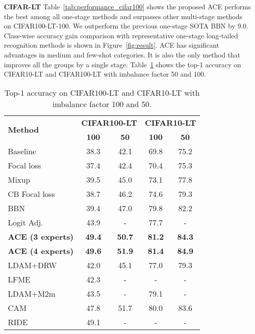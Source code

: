 \documentclass[10pt,twocolumn,letterpaper]{article}
\begin{document}
\textbf{CIFAR-LT} Table~\ref{tab:performance_cifar100} shows the proposed ACE performs the best among all one-stage methods and surpasses other multi-stage methods on CIFAR100-LT-100. We outperform the previous one-stage SOTA BBN by 9.0. Class-wise accuracy gain comparison with representative one-stage long-tailed recognition methods is shown in Figure~\ref{fig:result}. ACE has significant advantages in medium and few-shot categories. It is also the only method that improves all the groups by a single stage. Table~\ref{tab:performance_cifar} shows the top-1 accuracy on CIFAR10-LT and CIFAR100-LT with imbalance factor 50 and 100.\\

\begin{table}[t]
\small
\begin{center}
\begin{tabular}{p{2.7cm}|c c|c c}
\toprule[1.5pt]
 \multirow{2}{*}{\textbf{Method}} & \multicolumn{2}{c|}{\textbf{CIFAR100-LT}}  & \multicolumn{2}{c}{\textbf{CIFAR10-LT}}\\
 \cline{2-5}
 & \textbf{100} & \textbf{50} & \textbf{100} & \textbf{50} \\\hline
 Baseline & 38.3 & 42.1 & 69.8 & 75.2 \\
 Focal loss \cite{lin2017focal} & 37.4 & 42.4  & 70.4 & 75.3\\
 Mixup \cite{zhang2017mixup} & 39.5 & 45.0 & 73.1 & 77.8\\
 CB Focal loss \cite{cui2019class} & 38.7 & 46.2  & 74.6 & 79.3\\
 BBN \cite{zhou2020bbn} &39.4 &47.0  &79.8 &82.2\\
 Logit Adj.\cite{menon2020long} & 43.9 & - & 77.7 & -\\
 \rowcolor{yellow!20} \textbf{ACE (3 experts)} &\textbf{49.4} & \textbf{50.7} &\textbf{81.2} &\textbf{84.3} \\
  \rowcolor{yellow!20} \textbf{ACE (4 experts)} &\textbf{49.6} & \textbf{51.9} &\textbf{81.4} &\textbf{84.9} \\\hline
 LDAM+DRW \cite{cao2019learning} &42.0 &45.1 &77.0 &79.3\\
 LFME \cite{xiang2020learning}& 42.3 &- &- & -\\
 LDAM+M2m \cite{kim2020m2m}&43.5&- &79.1& - \\
 CAM \cite{zhang2021bag}&47.8 &51.7  &80.0 &83.6 \\
 RIDE \cite{wang2020long}&49.1 &- &- &- \\
\bottomrule[1.5pt]
\end{tabular}
\end{center}
\caption{Top-1 accuracy on CIFAR100-LT and CIFAR10-LT with imbalance factor 100 and 50.}
\label{tab:performance_cifar}
\end{table}
\end{document}
